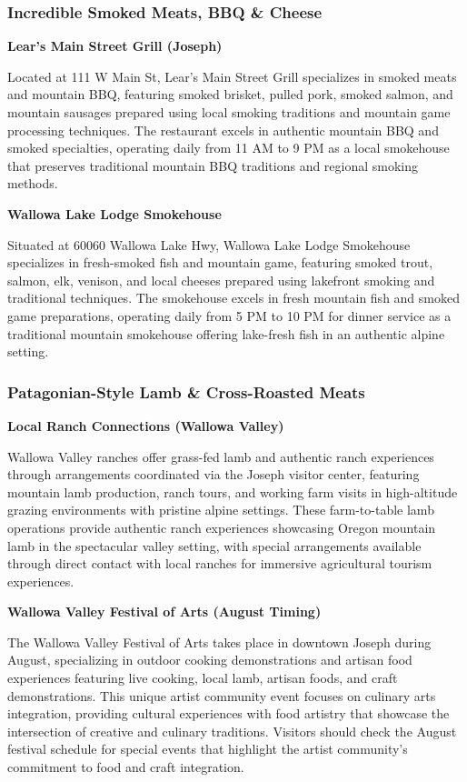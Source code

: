 \documentclass[
  11pt,
  letterpaper,
  DIV=10,
  numbers=noendperiod]{scrartcl}
\begin{document}
\subsubsection{Incredible Smoked Meats, BBQ \&
Cheese}\label{incredible-smoked-meats-bbq-cheese-2}

\textbf{Lear's Main Street Grill (Joseph)}

Located at 111 W Main St, Lear's Main Street Grill specializes in smoked
meats and mountain BBQ, featuring smoked brisket, pulled pork, smoked
salmon, and mountain sausages prepared using local smoking traditions
and mountain game processing techniques. The restaurant excels in
authentic mountain BBQ and smoked specialties, operating daily from 11
AM to 9 PM as a local smokehouse that preserves traditional mountain BBQ
traditions and regional smoking methods.

\textbf{Wallowa Lake Lodge Smokehouse}

Situated at 60060 Wallowa Lake Hwy, Wallowa Lake Lodge Smokehouse
specializes in fresh-smoked fish and mountain game, featuring smoked
trout, salmon, elk, venison, and local cheeses prepared using lakefront
smoking and traditional techniques. The smokehouse excels in fresh
mountain fish and smoked game preparations, operating daily from 5 PM to
10 PM for dinner service as a traditional mountain smokehouse offering
lake-fresh fish in an authentic alpine setting.

\subsubsection{Patagonian-Style Lamb \& Cross-Roasted
Meats}\label{patagonian-style-lamb-cross-roasted-meats-2}

\textbf{Local Ranch Connections (Wallowa Valley)}

Wallowa Valley ranches offer grass-fed lamb and authentic ranch
experiences through arrangements coordinated via the Joseph visitor
center, featuring mountain lamb production, ranch tours, and working
farm visits in high-altitude grazing environments with pristine alpine
settings. These farm-to-table lamb operations provide authentic ranch
experiences showcasing Oregon mountain lamb in the spectacular valley
setting, with special arrangements available through direct contact with
local ranches for immersive agricultural tourism experiences.

\textbf{Wallowa Valley Festival of Arts (August Timing)}

The Wallowa Valley Festival of Arts takes place in downtown Joseph
during August, specializing in outdoor cooking demonstrations and
artisan food experiences featuring live cooking, local lamb, artisan
foods, and craft demonstrations. This unique artist community event
focuses on culinary arts integration, providing cultural experiences
with food artistry that showcase the intersection of creative and
culinary traditions. Visitors should check the August festival schedule
for special events that highlight the artist community's commitment to
food and craft integration.
\end{document}
